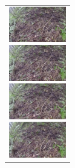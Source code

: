 \begin{figure}[H]
    \begin{tabular}{l}


\\ %


    \end{tabular}
\end{figure}
\begin{figure}[htbp]
    \begin{tabular}{l}
      \begin{minipage}{0.165\hsize}
        \begin{center}
          \includegraphics[clip, width=2.5cm]{./Figures/still_stop1-1.eps}
        \end{center}
      \end{minipage}
      \begin{minipage}{0.165\hsize}
        \begin{center}
          \includegraphics[clip, width=2.5cm]{./Figures/still_stop1-2.eps}
        \end{center}
      \end{minipage}
      \begin{minipage}{0.165\hsize}
        \begin{center}
          \includegraphics[clip, width=2.5cm]{./Figures/still_stop1-3.eps}
        \end{center}
      \end{minipage}
      \begin{minipage}{0.165\hsize}
        \begin{center}
          \includegraphics[clip, width=2.5cm]{./Figures/still_stop1-4.eps}
        \end{center}

\end{minipage}
\end{tabular}
\end{figure}
